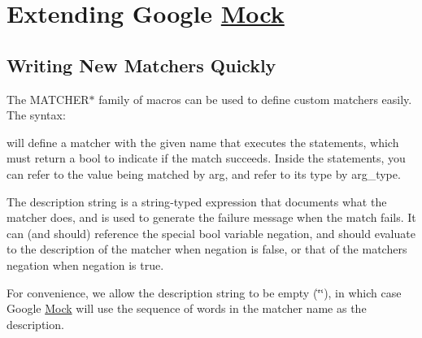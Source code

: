 \section*{Extending Google \mbox{\hyperlink{classMock}{Mock}}}

\subsection*{Writing New Matchers Quickly}

The {\ttfamily M\+A\+T\+C\+H\+E\+R$\ast$} family of macros can be used to define custom matchers easily. The syntax\+:


\begin{DoxyCode}{0}
\end{DoxyCode}


will define a matcher with the given name that executes the statements, which must return a {\ttfamily bool} to indicate if the match succeeds. Inside the statements, you can refer to the value being matched by {\ttfamily arg}, and refer to its type by {\ttfamily arg\+\_\+type}.

The description string is a {\ttfamily string}-\/typed expression that documents what the matcher does, and is used to generate the failure message when the match fails. It can (and should) reference the special {\ttfamily bool} variable {\ttfamily negation}, and should evaluate to the description of the matcher when {\ttfamily negation} is {\ttfamily false}, or that of the matcher\textquotesingle{}s negation when {\ttfamily negation} is {\ttfamily true}.

For convenience, we allow the description string to be empty ({\ttfamily \char`\"{}\char`\"{}}), in which case Google \mbox{\hyperlink{classMock}{Mock}} will use the sequence of words in the matcher name as the description.

